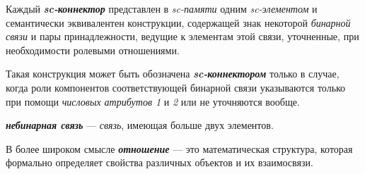 Каждый \textbf{\textit{sc-коннектор}} представлен в \textit{sc-памяти} одним \textit{sc-элементом} и семантически эквивалентен конструкции, содержащей знак некоторой \textit{бинарной связи} и пары принадлежности, ведущие к элементам этой связи, уточненные, при необходимости ролевыми отношениями.

Такая конструкция может быть обозначена \textbf{\textit{sc-коннектором}} только в случае, когда роли компонентов соответствующей бинарной связи указываются только при помощи \textit{числовых атрибутов 1\scnrolesign} и \textit{2\scnrolesign} или не уточняются вообще.
	
\textbf{\textit{небинарная связь}} --- \textit{связь}, имеющая больше двух элементов.

\begin{SCn}
	
	
	
\end{SCn}
	
В более широком смысле \textbf{\textit{отношение}} --- это математическая структура, которая формально определяет свойства различных объектов и их взаимосвязи.


